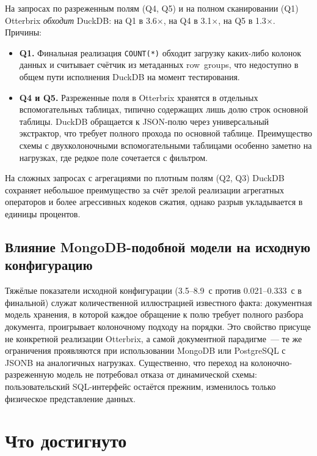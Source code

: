 На запросах по разреженным полям (Q4, Q5) и на полном сканировании
(Q1) Otterbrix \emph{обходит} DuckDB: на Q1 в 3.6$\times$, на Q4
в 3.1$\times$, на Q5 в 1.3$\times$. Причины:

\begin{itemize}
    \item \textbf{Q1.} Финальная реализация \texttt{COUNT(*)}
    обходит загрузку каких-либо колонок данных и считывает счётчик
    из метаданных row~groups, что недоступно в общем пути
    исполнения DuckDB на момент тестирования.
    \item \textbf{Q4 и Q5.} Разреженные поля в Otterbrix хранятся
    в отдельных вспомогательных таблицах, типично содержащих лишь
    долю строк основной таблицы. DuckDB обращается к JSON-полю
    через универсальный экстрактор, что требует полного прохода
    по основной таблице. Преимущество схемы с двухколоночными
    вспомогательными таблицами особенно заметно на нагрузках, где
    редкое поле сочетается с фильтром.
\end{itemize}

На сложных запросах с агрегациями по плотным полям (Q2, Q3) DuckDB
сохраняет небольшое преимущество за счёт зрелой реализации
агрегатных операторов и более агрессивных кодеков сжатия, однако
разрыв укладывается в единицы процентов.

\subsection{Влияние MongoDB-подобной модели на исходную конфигурацию}

Тяжёлые показатели исходной конфигурации (3.5--8.9~с против
0.021--0.333~с в финальной) служат количественной иллюстрацией
известного факта: документная модель хранения, в которой каждое
обращение к полю требует полного разбора документа, проигрывает
колоночному подходу на порядки. Это свойство присуще не конкретной
реализации Otterbrix, а самой документной парадигме~--- те же
ограничения проявляются при использовании MongoDB или PostgreSQL с
JSONB на аналогичных нагрузках. Существенно, что переход на
колоночно-разреженную модель не потребовал отказа от
динамической схемы: пользовательский SQL-интерфейс остаётся прежним,
изменилось только физическое представление данных.

\section{Что достигнуто}

